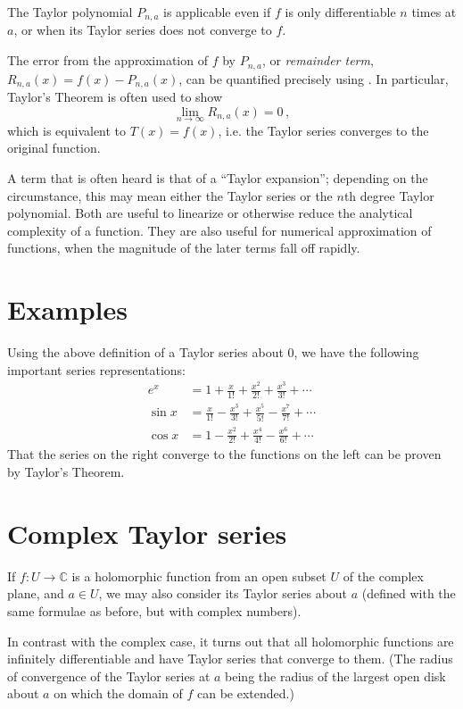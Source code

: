 \documentclass{article}
\newcommand{\complex}{\mathbb{C}}
\providecommand{\defnterm}[1]{\emph{#1}}
\begin{document}
The Taylor polynomial $P_{n,a}$ is applicable even if $f$ is only
differentiable $n$ times at $a$, or when its Taylor series does 
not converge to $f$.

The error from the approximation of $f$ by $P_{n,a}$,  
or \defnterm{remainder term}, $R_{n,a}(x) = f(x) - P_{n,a}(x)$, 
can be quantified precisely
using  .
In particular, Taylor's Theorem is often used to show
\[
 \lim_{n\rightarrow \infty} R_{n,a}(x) = 0 \,,
\]
which is equivalent to $T(x) = f(x)$, i.e. the Taylor series
converges to the original function.

A term that is often heard is that of a ``Taylor expansion'';
depending on the circumstance, this may mean either the Taylor series
or the $n$th degree Taylor polynomial.
Both are useful to linearize or otherwise reduce the analytical complexity of a function.  They are also useful for numerical approximation of functions,
when the magnitude of the later terms fall off rapidly.  

\section{Examples}
Using the above definition of a Taylor series about $0$, we have the following important series representations:
\begin{align*}
 e^x &= 1 + \frac{x}{1!} + \frac{x^2}{2!} + \frac{x^3}{3!} + \cdots \\ 
  \sin x &= \frac{x}{1!} - \frac{x^3}{3!} + \frac{x^5}{5!} - \frac{x^7}{7!} + \cdots \\
  \cos x &= 1-\frac{x^2}{2!} + \frac{x^4}{4!} - \frac{x^6}{6!} + \cdots 
\end{align*}
That the series on the right converge to the functions on the left
can be proven by Taylor's Theorem.

\section{Complex Taylor series}
If $f\colon U \to \complex$ is a holomorphic function from an open subset $U$ of the complex plane, and $a \in U$, we may also consider its Taylor series about $a$ (defined with the same formulae as before, but with complex numbers).

In contrast with the complex case, it turns out that all holomorphic functions
are infinitely differentiable and have Taylor series that converge to them.
(The radius of convergence of the Taylor series at $a$ being the radius of the largest open disk about $a$ on which the domain of $f$ can be extended.)
\end{document}
